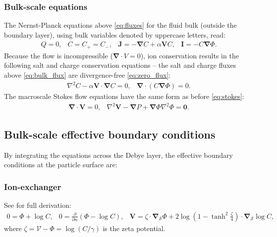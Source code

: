 \documentclass[10pt]{ijnam}
\newcommand{\deriv}[2]{\frac{\partial #1}{\partial #2}}
\newcommand{\pars}[1]{\left(#1\right)}
\newcommand\Laplacian{\nabla^2}
\newcommand\bnabla{\boldsymbol{\nabla}}
\newcommand\bV{\boldsymbol{V}}
\newcommand\bI{\boldsymbol{I}}
\newcommand\bJ{\boldsymbol{J}}
\newcommand\bzero{\boldsymbol{0}}
\newcommand\cV{\mathscr{V}}
\begin{document}
\subsubsection  {Bulk-scale equations}
The Nernst-Planck equations above \eqref{eq:fluxes} for the fluid bulk (outside
the boundary layer), using bulk variables denoted by uppercase letters, read:
\begin{equation} \begin{array}{cccc} \label{eq:bulk_flux}
  Q = 0, &
  C = C_+ = C_-, &
\bJ = -\bnabla C + \alpha \bV C, &
\bI = -C \bnabla \varPhi.
\end{array}\end{equation}
Because the flow is incompressible ($\bnabla \cdot V = 0$), 
ion conservation results in the following 
salt and charge conservation equations -- the salt and charge fluxes above 
\eqref{eq:bulk_flux} are divergence-free
\eqref{eq:zero_flux}:
\begin{equation} \begin{array}{ccc}
\label{eq:salt_charge}
\Laplacian C - \alpha \bV \cdot \bnabla C = 0, &
\bnabla \cdot \pars{ C \bnabla \varPhi } = 0.
\end{array}\end{equation}
The macroscale Stokes flow equations have the same form as before \eqref{eq:stokes}:
\begin{equation}
\begin{array}{ccc}
\bnabla \cdot \bV = 0, &   
\Laplacian \bV - \bnabla P + \bnabla \varPhi \Laplacian \varPhi = \bzero.
\end{array}
\end{equation}

\subsection{Bulk-scale effective boundary conditions}
By integrating the equations across the Debye layer,
the effective boundary conditions at the particle surface are:
\subsubsection{Ion-exchanger} See \cite{yariv2010migration} for full derivation:
\begin{equation}
\begin{array}{ccc}
\label{eq:ionex_bnd}
0 = \varPhi + \log C, &
0 = \deriv{}{n} \pars{\varPhi - \log C}, &
\bV = 
\zeta \cdot \bnabla_\mathcal{S} \varPhi 
+ 2\log\pars{1-\tanh^2\frac{\zeta}{4}} \cdot \bnabla_\mathcal{S} \log C,
\end{array}\end{equation}
where $\zeta = \cV - \varPhi = \log (C / \gamma)$ 
is the zeta potential.
\end{document}
